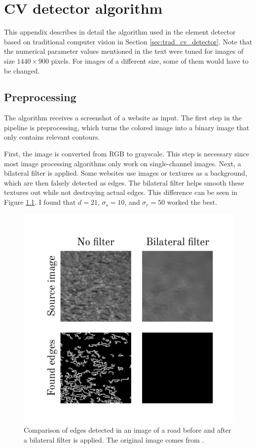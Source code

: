 \documentclass[
  digital,     %
  oneside,     %
  nosansbold,  %
  nocolorbold, %
  lof,         %
  lot,         %
]{fithesis4}
\begin{document}
\chapter{CV detector algorithm}
\label{ap:cv}

This appendix describes in detail the algorithm used in the element detector based on traditional computer vision in Section \ref{sec:trad_cv_detector}. Note that the numerical parameter values mentioned in the text were tuned for images of size $1440\times900$ pixels. For images of a different size, some of them would have to be changed.

\section{Preprocessing}

The algorithm receives a screenshot of a website as input. The first step in the pipeline is preprocessing, which turns the colored image into a binary image that only contains relevant contours.

First, the image is converted from RGB to grayscale. This step is necessary since most image processing algorithms only work on single-channel images. Next, a bilateral filter is applied. Some websites use images or textures as a background, which are then falsely detected as edges. The bilateral filter helps smooth these textures out while not destroying actual edges. This difference can be seen in Figure \ref{fig:bilateral}. I found that $d=21$, $\sigma_s =10$, and $\sigma_r = 50$ worked the best.

\begin{figure}
    \centering
    \includegraphics[width=1\linewidth]{diagrams/bilateral.pdf}
    \caption{Comparison of edges detected in an image of a road before and after a bilateral filter is applied. The original image comes from \cite{aydos2020}.}
    \label{fig:bilateral}
\end{figure}
\end{document}

